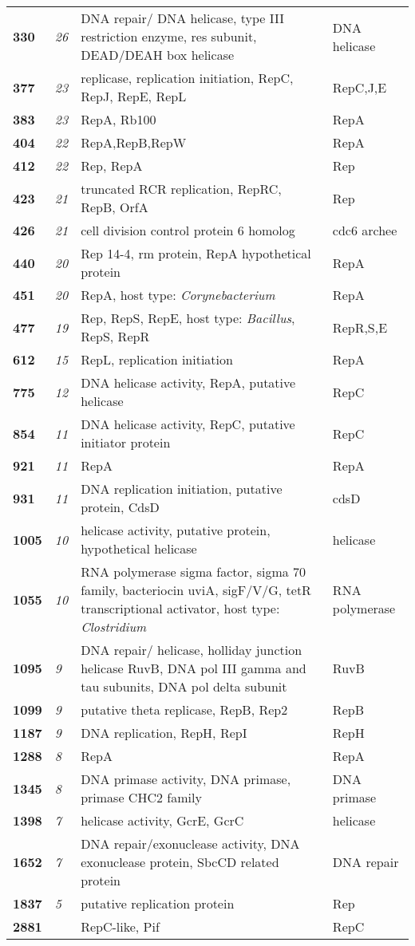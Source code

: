 \begin{longtable}{ >{\bfseries\small}p{}| >{\itshape\small}p{} >{\small}p{} | >{\small}p{}}
330 & 26 & DNA repair/ DNA helicase, type III restriction enzyme, res subunit, DEAD/DEAH box helicase & DNA helicase\\
377 & 23 & replicase, replication initiation, RepC, RepJ, RepE, RepL & RepC,J,E\\
383 & 23 & RepA, Rb100 & RepA\\
404 & 22 & RepA,RepB,RepW & RepA\\
412 & 22 & Rep, RepA & Rep\\
423 & 21 & truncated RCR replication, RepRC, RepB, OrfA & Rep\\
426 & 21 & cell division control protein 6 homolog & cdc6 archee\\
440 & 20 & Rep 14-4, rm protein, RepA hypothetical protein & RepA\\
451 & 20 & RepA, host type: \textit{Corynebacterium} & RepA\\
477 & 19 & Rep, RepS, RepE, host type: \textit{Bacillus}, RepS, RepR & RepR,S,E\\
612 & 15 & RepL, replication initiation & RepA\\
775 & 12 & DNA helicase activity, RepA, putative helicase & RepC\\
854 & 11 & DNA helicase activity, RepC, putative initiator protein & RepC\\
921 & 11 & RepA & RepA\\
931 & 11 & DNA replication initiation, putative protein, CdsD & cdsD\\
1005 & 10 & helicase activity, putative protein, hypothetical helicase & helicase\\
1055 & 10 & RNA polymerase sigma factor, sigma 70 family, bacteriocin uviA, sigF/V/G, tetR transcriptional activator, host type: \textit{Clostridium} & RNA polymerase\\
1095 & 9 & DNA repair/ helicase, holliday junction helicase RuvB, DNA pol III gamma and tau subunits, DNA pol delta subunit & RuvB\\
1099 & 9 & putative theta replicase, RepB, Rep2 & RepB\\
1187 & 9 & DNA replication, RepH, RepI & RepH\\
1288 & 8 & RepA & RepA\\
1345 & 8 & DNA primase activity, DNA primase, primase CHC2 family & DNA primase\\
1398 & 7 & helicase activity, GcrE, GcrC & helicase\\
1652 & 7 & DNA repair/exonuclease activity, DNA exonuclease protein, SbcCD related protein & DNA repair\\
1837 & 5 & putative replication protein & Rep\\
2881 & & RepC-like, Pif & RepC\\
\end{longtable}

